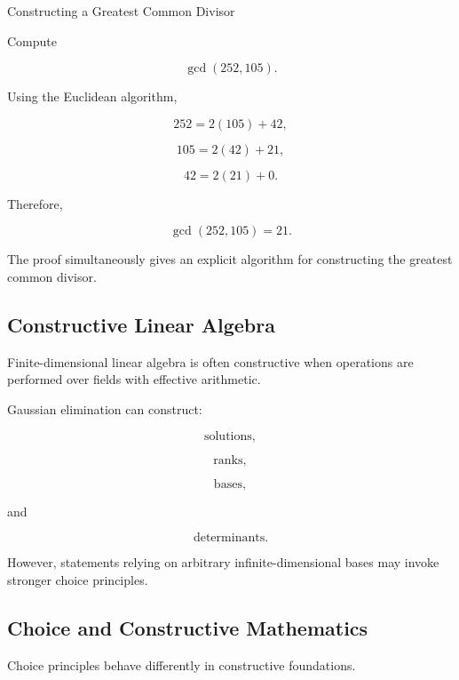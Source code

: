 \begin{workedexamplebox}{Constructing a Greatest Common Divisor}

Compute

\[
\gcd(252,105).
\]

Using the Euclidean algorithm,

\[
252
=
2(105)+42,
\]

\[
105
=
2(42)+21,
\]

\[
42
=
2(21)+0.
\]

Therefore,

\begin{answerbox}
\[
\boxed{
\gcd(252,105)=21.
}
\]
\end{answerbox}

The proof simultaneously gives an explicit algorithm for constructing the
greatest common divisor.

\end{workedexamplebox}

\subsection{Constructive Linear Algebra}
\label{subsec:constructive-linear-algebra}

Finite-dimensional linear algebra is often constructive when operations are
performed over fields with effective arithmetic.

Gaussian elimination can construct:

\[
\boxed{
\text{solutions},
}
\]

\[
\boxed{
\text{ranks},
}
\]

\[
\boxed{
\text{bases},
}
\]

and

\[
\boxed{
\text{determinants}.
}
\]

However, statements relying on arbitrary infinite-dimensional bases may
invoke stronger choice principles.

\subsection{Choice and Constructive Mathematics}
\label{subsec:choice-constructive-mathematics}

Choice principles behave differently in constructive foundations.


